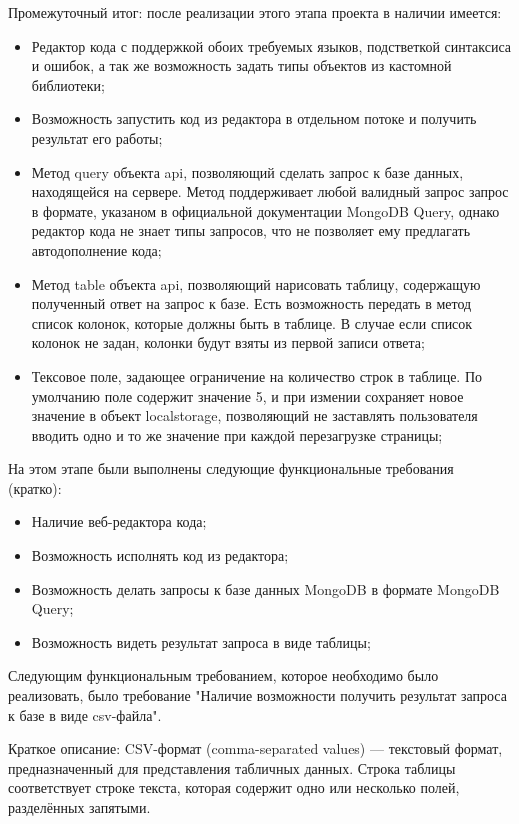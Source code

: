 \documentclass[12pt]{article}
\begin{document}
    Промежуточный итог: после реализации этого этапа проекта в наличии имеется:
    \begin{itemize}
        \item Редактор кода с поддержкой обоих требуемых языков, подстветкой синтаксиса и ошибок, а так же возможность задать типы объектов из
        кастомной библиотеки;
        \item Возможность запустить код из редактора в отдельном потоке и получить результат его работы;
        \item Метод query объекта api, позволяющий сделать запрос к базе данных, находящейся на сервере. Метод поддерживает любой валидный запрос
        запрос в формате, указаном в официальной документации MongoDB Query, однако редактор кода не знает типы запросов, что не позволяет ему
        предлагать автодополнение кода;
        \item Метод table объекта api, позволяющий нарисовать таблицу, содержащую полученный ответ на запрос к базе. Есть возможность передать в метод
        список колонок, которые должны быть в таблице. В случае если список колонок не задан, колонки будут взяты из первой записи ответа;
        \item Тексовое поле, задающее ограничение на количество строк в таблице. По умолчанию поле содержит значение 5, и при измении сохраняет
        новое значение в объект localstorage, позволяющий не заставлять пользователя вводить одно и то же значение при каждой перезагрузке
        страницы;
    \end{itemize}
    На этом этапе были выполнены следующие функциональные требования (кратко):
    \begin{itemize}
        \item Наличие веб-редактора кода;
        \item Возможность исполнять код из редактора;
        \item Возможность делать запросы к базе данных MongoDB в формате MongoDB Query;
        \item Возможность видеть результат запроса в виде таблицы;
    \end{itemize}
    Следующим функциональным требованием, которое необходимо было реализовать, было требование "Наличие возможности получить результат запроса к базе
    в виде csv-файла".

    Краткое описание: CSV-формат (comma-separated values) --- текстовый формат, предназначенный для представления табличных данных. Строка
    таблицы соответствует строке текста, которая содержит одно или несколько полей, разделённых запятыми.
\end{document}
